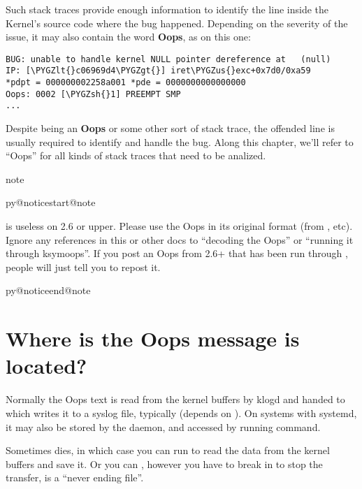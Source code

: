 \documentclass[a4paper,8pt,english]{sphinxmanual}
\makeatletter
\renewenvironment{notice}[2]{%
          \def\py@noticetype{#1}
          \begin{coloredbox}{#1}
          \bf\it
          \par\strong{#2}
          \csname py@noticestart@#1\endcsname
        }
	{
          \csname py@noticeend@\py@noticetype\endcsname
          \end{coloredbox}
        }
\def\PYGZus{\char`\_}
\def\PYGZlt{\char`\<}
\def\PYGZgt{\char`\>}
\def\PYGZsh{\char`\#}
\makeatother
\begin{document}
Such stack traces provide enough information to identify the line inside the
Kernel's source code where the bug happened. Depending on the severity of
the issue, it may also contain the word \textbf{Oops}, as on this one:

\begin{Verbatim}[commandchars=\\\{\}]
BUG: unable to handle kernel NULL pointer dereference at   (null)
IP: [\PYGZlt{}c06969d4\PYGZgt{}] iret\PYGZus{}exc+0x7d0/0xa59
*pdpt = 000000002258a001 *pde = 0000000000000000
Oops: 0002 [\PYGZsh{}1] PREEMPT SMP
...
\end{Verbatim}

Despite being an \textbf{Oops} or some other sort of stack trace, the offended
line is usually required to identify and handle the bug. Along this chapter,
we'll refer to ``Oops'' for all kinds of stack traces that need to be analized.

\begin{notice}{note}{Note:}
 is useless on 2.6 or upper.  Please use the Oops in its original
format (from , etc).  Ignore any references in this or other docs to
``decoding the Oops'' or ``running it through ksymoops''.
If you post an Oops from 2.6+ that has been run through ,
people will just tell you to repost it.
\end{notice}


\section{Where is the Oops message is located?}
\label{admin-guide/bug-hunting:where-is-the-oops-message-is-located}
Normally the Oops text is read from the kernel buffers by klogd and
handed to  which writes it to a syslog file, typically
 (depends on ). On systems with
systemd, it may also be stored by the  daemon, and accessed
by running  command.

Sometimes  dies, in which case you can run  to
read the data from the kernel buffers and save it.  Or you can
, however you have to break in to stop the transfer,
 is a ``never ending file''.
\end{document}
